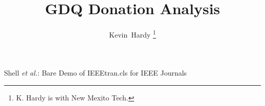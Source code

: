 \documentclass[journal]{IEEEtran}
\begin{document}
%
\title{GDQ Donation Analysis}
%
%
%

\author{Kevin~Hardy%
\thanks{K. Hardy is with New Mexito Tech.}%
}

% 
%



%
{Shell \MakeLowercase{\textit{et al.}}: Bare Demo of IEEEtran.cls for IEEE Journals}
% 
\end{document}
